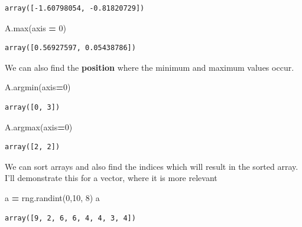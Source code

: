 \documentclass[
  letterpaper,
]{scrbook}
\newenvironment{Shaded}{\begin{snugshade}}{\end{snugshade}}
\newcommand{\BuiltInTok}[1]{#1}
\newcommand{\DecValTok}[1]{\textcolor[rgb]{0.00,0.00,0.81}{#1}}
\newcommand{\NormalTok}[1]{#1}
\newcommand{\OperatorTok}[1]{\textcolor[rgb]{0.81,0.36,0.00}{\textbf{#1}}}
\begin{document}
\begin{verbatim}
array([-1.60798054, -0.81820729])
\end{verbatim}

\begin{Shaded}
\begin{Highlighting}[]
\NormalTok{A.}\BuiltInTok{max}\NormalTok{(axis }\OperatorTok{=} \DecValTok{0}\NormalTok{)}
\end{Highlighting}
\end{Shaded}

\begin{verbatim}
array([0.56927597, 0.05438786])
\end{verbatim}

We can also find the \textbf{position} where the minimum and maximum values occur.

\begin{Shaded}
\begin{Highlighting}[]
\NormalTok{A.argmin(axis}\OperatorTok{=}\DecValTok{0}\NormalTok{)}
\end{Highlighting}
\end{Shaded}

\begin{verbatim}
array([0, 3])
\end{verbatim}

\begin{Shaded}
\begin{Highlighting}[]
\NormalTok{A.argmax(axis}\OperatorTok{=}\DecValTok{0}\NormalTok{)}
\end{Highlighting}
\end{Shaded}

\begin{verbatim}
array([2, 2])
\end{verbatim}

We can sort arrays and also find the indices which will result in the sorted array. I'll demonstrate this for a vector, where it is more relevant

\begin{Shaded}
\begin{Highlighting}[]
\NormalTok{a }\OperatorTok{=}\NormalTok{ rng.randint(}\DecValTok{0}\NormalTok{,}\DecValTok{10}\NormalTok{, }\DecValTok{8}\NormalTok{)}
\NormalTok{a}
\end{Highlighting}
\end{Shaded}

\begin{verbatim}
array([9, 2, 6, 6, 4, 4, 3, 4])
\end{verbatim}
\end{document}
